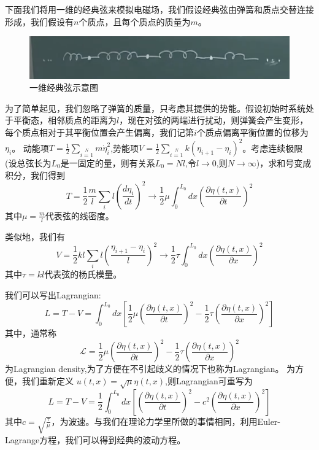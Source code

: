 下面我们将用一维的经典弦来模拟电磁场，我们假设经典弦由弹簧和质点交替连接形成，我们假设有$n$个质点，且每个质点的质量为$m$。
\begin{figure}[htbp]
    \centering
    \includegraphics{img/1.png}
    \caption{一维经典弦示意图}
    \label{fig:my_label}
\end{figure}
为了简单起见，我们忽略了弹簧的质量，只考虑其提供的势能。假设初始时系统处于平衡态，相邻质点的距离为$l$，现在对弦的两端进行扰动，则弹簧会产生变形，每个质点相对于其平衡位置会产生偏离，我们记第$i$个质点偏离平衡位置的位移为$\eta_{i}$。
动能项$T=\frac{1}{2}\sum\limits_{i=1}\limits^{N}m\dot{\eta}_{i}^{2}$,势能项$V=\frac{1}{2}\sum\limits_{i=1}\limits^{N}k(\eta_{i+1}-\eta_{i})^{2}$。考虑连续极限(设总弦长为$L_{0}$是一固定的量，则有关系$L_{0}=Nl$,令$l\rightarrow0$,则$N\rightarrow \infty$)，求和号变成积分，我们得到
\begin{equation}
    T=\frac{1}{2}\frac{m}{l}\sum\limits_{i}l\left(\frac{d\eta_{i}}{dt}\right)^{2}
    \rightarrow\frac{1}{2}\mu\int_{0}^{L_{0}}dx\left(\frac{\partial \eta(t,x)}{\partial t}\right)^{2}
\end{equation}
其中$\mu=\frac{m}{l}$代表弦的线密度。

类似地，我们有
\begin{equation}
    V=\frac{1}{2}kl\sum\limits_{i}l\left(\frac{\eta_{i+1}-\eta_{i}}{l}\right)^{2}
    \rightarrow\frac{1}{2}\tau\int_{0}^{L_{0}}dx\left(\frac{\partial \eta(t,x)}{\partial x}\right)^{2}
\end{equation}
其中$\tau=kl$代表弦的杨氏模量。

我们可以写出Lagrangian:
\begin{equation}
L=T-V=\int_{0}^{L_{0}}dx\left[\frac{1}{2}\mu\left(\frac{\partial \eta(t,x)}{\partial t}\right)^{2}-\frac{1}{2}\tau \left(\frac{\partial \eta(t,x)}{\partial x}\right)^{2}\right]
\end{equation}
其中，通常称
\begin{equation}
    \mathcal{L}=\frac{1}{2}\mu\left(\frac{\partial \eta(t,x)}{\partial t}\right)^{2}-\frac{1}{2}\tau \left(\frac{\partial \eta(t,x)}{\partial x}\right)^{2}
\end{equation}
为Lagrangian density,为了方便在不引起歧义的情况下也称为Lagrangian。
为方便，我们重新定义
$u(t,x)=\sqrt{\mu}\eta(t,x)$,则Lagrangian可重写为
\begin{equation}
\label{lagran}
L=T-V=\frac{1}{2}\int_{0}^{L_{0}}dx\left[\left(\frac{\partial \eta(t,x)}{\partial t}\right)^{2}-c^{2} \left(\frac{\partial \eta(t,x)}{\partial x}\right)^{2}\right]
\end{equation}
其中$c=\sqrt{\frac{\tau}{\mu}}$，为波速。与我们在理论力学里所做的事情相同，利用Euler-Lagrange方程，我们可以得到经典的波动方程。

